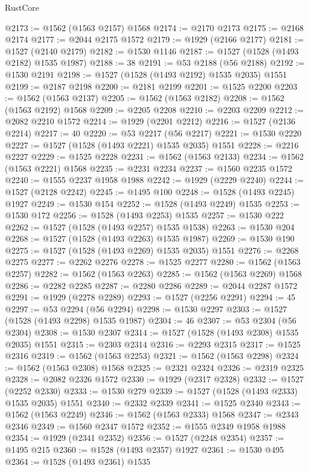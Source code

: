 \begin{lexlean}{RustCore}
\begin{coremodule}
@2173 := @1562 (@1563 @2157) @1568
@2174 := @2170 @2173
@2175 := @2168 @2174
@2177 := @2044 @2175 @1572
@2179 := @1929 (@2166 @2177)
@2181 := @1527 (@2140 @2179)
@2182 := @1530 @1146
@2187 := @1527 (@1528 (@1493 @2182) @1535 @1987)
@2188 := 38
@2191 := @53 @2188 (@56 @2188)
@2192 := @1530 @2191
@2198 := @1527 (@1528 (@1493 @2192) @1535 @2035) @1551
@2199 := @2187 @2198
@2200 := @2181 @2199
@2201 := @1525 @2200
@2203 := @1562 (@1563 @2137)
@2205 := @1562 (@1563 @2182)
@2208 := @1562 (@1563 @2192) @1568
@2209 := @2205 @2208
@2210 := @2203 @2209
@2212 := @2082 @2210 @1572
@2214 := @1929 (@2201 @2212)
@2216 := @1527 (@2136 @2214)
@2217 := 40
@2220 := @53 @2217 (@56 @2217)
@2221 := @1530 @2220
@2227 := @1527 (@1528 (@1493 @2221) @1535 @2035) @1551
@2228 := @2216 @2227
@2229 := @1525 @2228
@2231 := @1562 (@1563 @2133)
@2234 := @1562 (@1563 @2221) @1568
@2235 := @2231 @2234
@2237 := @1560 @2235 @1572
@2240 := @1555 @2237 @1958 @1988
@2242 := @1929 (@2229 @2240)
@2244 := @1527 (@2128 @2242)
@2245 := @1495 @100
@2248 := @1528 (@1493 @2245) @1927
@2249 := @1530 @154
@2252 := @1528 (@1493 @2249) @1535
@2253 := @1530 @172
@2256 := @1528 (@1493 @2253) @1535
@2257 := @1530 @222
@2262 := @1527 (@1528 (@1493 @2257) @1535 @1538)
@2263 := @1530 @204
@2268 := @1527 (@1528 (@1493 @2263) @1535 @1987)
@2269 := @1530 @190
@2275 := @1527 (@1528 (@1493 @2269) @1535 @2035) @1551
@2276 := @2268 @2275
@2277 := @2262 @2276
@2278 := @1525 @2277
@2280 := @1562 (@1563 @2257)
@2282 := @1562 (@1563 @2263)
@2285 := @1562 (@1563 @2269) @1568
@2286 := @2282 @2285
@2287 := @2280 @2286
@2289 := @2044 @2287 @1572
@2291 := @1929 (@2278 @2289)
@2293 := @1527 (@2256 @2291)
@2294 := 45
@2297 := @53 @2294 (@56 @2294)
@2298 := @1530 @2297
@2303 := @1527 (@1528 (@1493 @2298) @1535 @1987)
@2304 := 46
@2307 := @53 @2304 (@56 @2304)
@2308 := @1530 @2307
@2314 := @1527 (@1528 (@1493 @2308) @1535 @2035) @1551
@2315 := @2303 @2314
@2316 := @2293 @2315
@2317 := @1525 @2316
@2319 := @1562 (@1563 @2253)
@2321 := @1562 (@1563 @2298)
@2324 := @1562 (@1563 @2308) @1568
@2325 := @2321 @2324
@2326 := @2319 @2325
@2328 := @2082 @2326 @1572
@2330 := @1929 (@2317 @2328)
@2332 := @1527 (@2252 @2330)
@2333 := @1530 @279
@2339 := @1527 (@1528 (@1493 @2333) @1535 @2035) @1551
@2340 := @2332 @2339
@2341 := @1525 @2340
@2343 := @1562 (@1563 @2249)
@2346 := @1562 (@1563 @2333) @1568
@2347 := @2343 @2346
@2349 := @1560 @2347 @1572
@2352 := @1555 @2349 @1958 @1988
@2354 := @1929 (@2341 @2352)
@2356 := @1527 (@2248 @2354)
@2357 := @1495 @215
@2360 := @1528 (@1493 @2357) @1927
@2361 := @1530 @495
@2364 := @1528 (@1493 @2361) @1535

\end{coremodule}
\end{lexlean}
